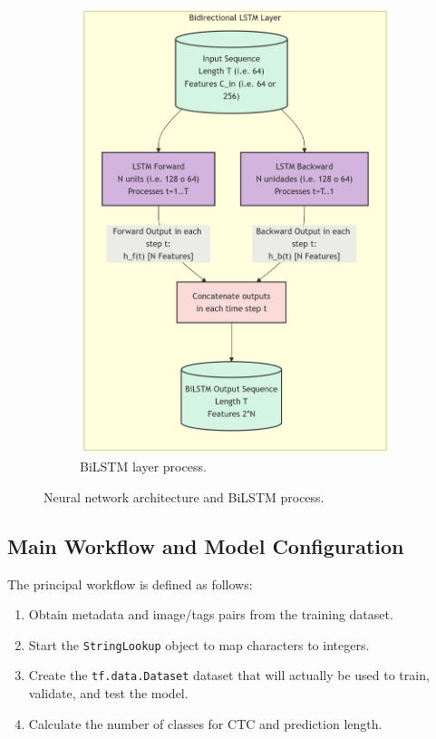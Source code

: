 \documentclass[11pt,letterpaper]{article}
\begin{document}
\begin{figure}[h]
\begin{subfigure}[b]{0.38\linewidth}
			\includegraphics[width=\linewidth]{bilstm_process_v2.png}
			\caption{BiLSTM layer process.}
			\label{fig:bilstm_process}
		\end{subfigure}
		\caption{Neural network architecture and BiLSTM process.}
		\label{fig:combined}
	\end{figure}
	
	\newpage
	
	\subsection{Main Workflow and Model Configuration}
	The principal workflow is defined as follows:
	\begin{enumerate}
		\item Obtain metadata and image/tags pairs from the training dataset.
		\item Start the \texttt{StringLookup} object to map characters to integers.
		\item Create the \texttt{tf.data.Dataset} dataset that will actually be used to train, validate, and test the model.
		\item Calculate the number of classes for CTC and prediction length.
	\end{enumerate}
	
\end{document}
